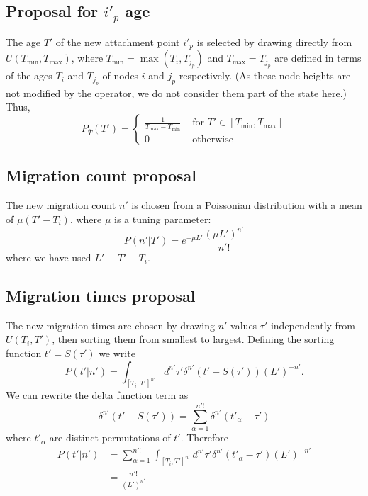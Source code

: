 \documentclass[a4paper,11pt]{article}
\begin{document}
\subsection{Proposal for $i'_p$ age}

The age $T'$ of the new attachment point $i'_p$ is selected by drawing directly from
$U(T_{\min},T_{\max})$, where $T_{\min}=\max(T_i,T_{j_p})$ and
$T_{\max}=T_{j_p}$ are defined in terms of the ages $T_i$ and
$T_{j_p}$ of nodes $i$ and $j_p$ respectively. (As these node heights
are not modified by the operator, we do not consider them part of the
state here.) Thus,
\begin{equation}
  P_{\bar{T}}(T') = \left\{\begin{array}{rl}
      \frac{1}{T_{\max}-T_{\min}} & \text{ for } T'\in[T_{\min},T_{\max}]\\
      0 & \text{ otherwise}\end{array}\right.
\end{equation}

\subsection{Migration count proposal}

The new migration count $n'$ is chosen from a Poissonian distribution
with a mean of $\mu (T'-T_i)$, where $\mu$ is a tuning parameter:
\begin{equation}
  P(n'|T') = e^{-\mu L'}\frac{(\mu L')^{n'}}{n'!}
\end{equation}
where we have used $L'\equiv T'-T_i$.

\subsection{Migration times proposal}

The new migration times are chosen by drawing $n'$ values $\tau'$
independently from $U(T_i,T')$, then sorting them from smallest to
largest. Defining the sorting function $t'=S(\tau')$ we write
\begin{equation}
  P(t'|n') = \int_{[T_i,T']^{n'}}d^{n'}\tau'\delta^{n'}(t'-S(\tau'))(L')^{-n'}.
\end{equation}
We can rewrite the delta function term as
\begin{equation}
  \delta^{n'}(t'-S(\tau'))=\sum_{\alpha=1}^{n'!}\delta^{n'}(t'_{\alpha}-\tau')
\end{equation}
where $t'_{\alpha}$ are distinct permutations of $t'$. Therefore
\begin{align}
  P(t'|n')&=\sum_{\alpha=1}^{n'!}\int_{[T_i,T']^{n'}}d^{n'}\tau'\delta^{n'}(t'_{\alpha}-\tau')(L')^{-n'}\nonumber\\
&=\frac{n'!}{(L')^{n'}}
\end{align}
\end{document}
